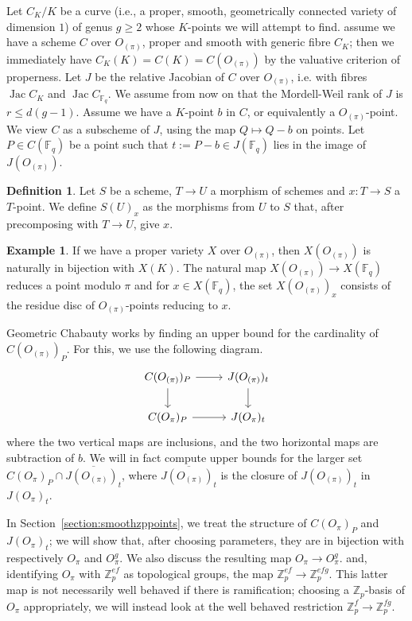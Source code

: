 \documentclass[12pt]{article}
\newcommand{\Z}{\mathbb{Z}}
\newcommand{\F}{\mathbb{F}}
\DeclareMathOperator{\Jac}{Jac}
\theoremstyle{plain}
\theoremstyle{definition}
\newtheorem{defn}[thm]{Definition} %
\newtheorem{exmp}[thm]{Example} %
\theoremstyle{remark}
\begin{document}
Let $C_{K}/K$ be a curve (i.e., a proper, smooth, geometrically connected variety of dimension $1$) of genus $g \geq 2$ whose $K$-points we will attempt to find. assume we have a scheme $C$ over $O_{(\pi)}$, proper and smooth with generic fibre $C_{K}$; then we immediately have $C_K(K) = C(K) = C(O_{(\pi)})$ by the valuative criterion of properness. Let $J$ be the relative Jacobian of $C$ over $O_{(\pi)}$, i.e. with fibres $\Jac C_K$ and $\Jac C_{\F_q}$. We assume from now on that the Mordell-Weil rank of $J$ is $r \leq d(g-1)$. Assume we have a $K$-point $b$ in $C$, or equivalently a $O_{(\pi)}$-point. We view $C$ as a subscheme of $J$, using the map $Q \mapsto Q - b$ on points. Let $P \in C(\F_q)$ be a point such that $t := P - b \in J(\F_q)$ lies in the image of $J(O_{(\pi)})$.

\begin{defn}
Let $S$ be a scheme, $T \to U$ a morphism of schemes and $x : T \to S$ a $T$-point. We define $S(U)_x$ as the morphisms from $U$ to $S$ that, after precomposing with $T \to U$, give $x$.
\end{defn}
\begin{exmp}
If we have a proper variety $X$ over $O_{(\pi)}$, then $X(O_{(\pi)})$ is naturally in bijection with $X(K)$. The natural map $X(O_{(\pi)}) \to X(\F_q)$ reduces a point modulo $\pi$ and for $x \in X(\F_q)$, the set $X(O_{(\pi)})_x$ consists of the residue disc of $O_{(\pi)}$-points reducing to $x$.
\end{exmp}

Geometric Chabauty works by finding an upper bound for the cardinality of $C(O_{(\pi)})_P$. For this, we use the following diagram.
\[
\begin{tikzcd}
C(O_{(\pi)})_P \arrow[d] \arrow[r] & J(O_{(\pi)})_t \arrow[d] \\
C(O_\pi)_P \arrow[r]              & J(O_\pi)_t        
\end{tikzcd}
\]
where the two vertical maps are inclusions, and the two horizontal maps are subtraction of $b$. We will in fact compute upper bounds for the larger set $C(O_\pi)_P \cap \overline{J(O_{(\pi)})_t}$, where $\overline{J(O_{(\pi)})_t}$ is the closure of $J(O_{(\pi)})_t$ in $J(O_\pi)_t$. 

In Section~\ref{section:smoothzppoints}, we treat the structure of $C(O_\pi)_P$ and $J(O_\pi)_t$; we will show that, after choosing parameters, they are in bijection with respectively $O_\pi$ and $O_\pi^g$. We also discuss the resulting map $O_\pi \to O_\pi^g$.{\color{red} and, identifying $O_\pi$ with $\Z_p^{ef}$ as topological groups, the map $\Z_p^{ef} \to \Z_p^{efg}$. This latter map is not necessarily well behaved if there is ramification; choosing a $\Z_p$-basis of $O_{\pi}$ appropriately, we will instead look at the well behaved restriction $\Z_p^{f} \to \Z_p^{fg}$.}
\end{document}
